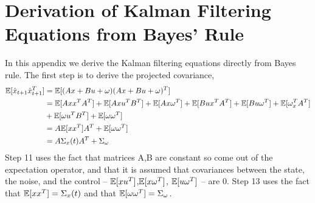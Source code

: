 \chapter{Derivation of Kalman Filtering Equations from Bayes' Rule}

In this appendix we derive the Kalman filtering equations directly from Bayes rule. The first step is to derive the projected covariance,
\begin{align}
    \mathbb{E}[\hat{x}_{t+1}\hat{x}_{t+1}^T] &= \mathbb{E}[(Ax + Bu + \omega)(Ax + Bu + \omega)^T] \\
    &= \mathbb{E}[Ax x^TA^T] + \mathbb{E}[Ax u^TB^T] + \mathbb{E}[Ax\omega^T] + \mathbb{E}[Bu x^TA^T] + \mathbb{E}[Bu\omega^T] + \mathbb{E}[\omega_x^T A^T] \\ &+ \mathbb{E}[\omega u^TB^T] + \mathbb{E}[\omega\omega^T] \\
    &= A \mathbb{E}[xx^T]A^T + \mathbb{E}[\omega\omega^T] \\
    &= A\Sigma_x(t)A^T + \Sigma_\omega 
\end{align}
Step 11 uses the fact that matrices A,B are constant so come out of the expectation operator, and that it is assumed that covariances between the state, the noise, and the control -- $\mathbb{E}[x u^T]$,$\mathbb{E}[x\omega^T]$, $\mathbb{E}[u\omega^T]$ -- are 0. Step 13 uses the fact that $\mathbb{E}[xx^T] = \Sigma_x(t)$ and that $\mathbb{E}[\omega\omega^T] = \Sigma_\omega$.

